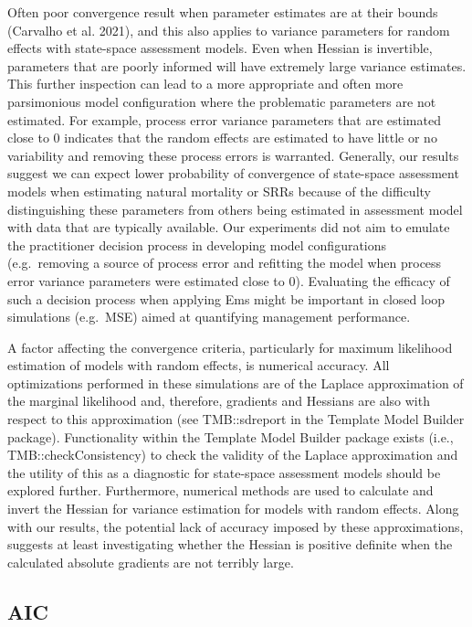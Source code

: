 \documentclass[
  12pt,
]{article}
\begin{document}
Often poor convergence result when parameter estimates are at their
bounds (Carvalho et al. 2021), and this also applies to variance
parameters for random effects with state-space assessment models. Even
when Hessian is invertible, parameters that are poorly informed will
have extremely large variance estimates. This further inspection can
lead to a more appropriate and often more parsimonious model
configuration where the problematic parameters are not estimated. For
example, process error variance parameters that are estimated close to 0
indicates that the random effects are estimated to have little or no
variability and removing these process errors is warranted. Generally,
our results suggest we can expect lower probability of convergence of
state-space assessment models when estimating natural mortality or SRRs
because of the difficulty distinguishing these parameters from others
being estimated in assessment model with data that are typically
available. Our experiments did not aim to emulate the practitioner
decision process in developing model configurations (e.g.~removing a
source of process error and refitting the model when process error
variance parameters were estimated close to 0). Evaluating the efficacy
of such a decision process when applying Ems might be important in
closed loop simulations (e.g.~MSE) aimed at quantifying management
performance.

A factor affecting the convergence criteria, particularly for maximum
likelihood estimation of models with random effects, is numerical
accuracy. All optimizations performed in these simulations are of the
Laplace approximation of the marginal likelihood and, therefore,
gradients and Hessians are also with respect to this approximation (see
TMB::sdreport in the Template Model Builder package). Functionality
within the Template Model Builder package exists (i.e.,
TMB::checkConsistency) to check the validity of the Laplace
approximation and the utility of this as a diagnostic for state-space
assessment models should be explored further. Furthermore, numerical
methods are used to calculate and invert the Hessian for variance
estimation for models with random effects. Along with our results, the
potential lack of accuracy imposed by these approximations, suggests at
least investigating whether the Hessian is positive definite when the
calculated absolute gradients are not terribly large.

\hypertarget{aic}{%
\subsection*{AIC}\label{aic}}
\end{document}
